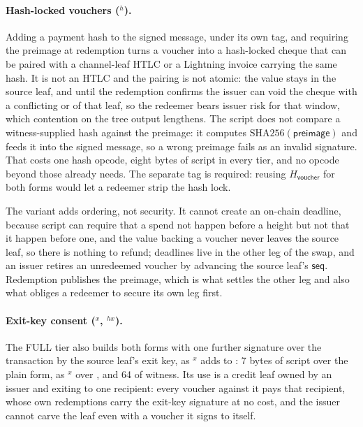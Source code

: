 \paragraph{Hash-locked vouchers ($^{h}$).} Adding a payment hash
to the signed message, under its own tag, and requiring the preimage at
redemption turns a voucher into a hash-locked cheque that can be paired
with a channel-leaf HTLC or a Lightning invoice carrying the same hash.
It is not an HTLC and the pairing is not atomic: the value stays in the
source leaf, and until the redemption confirms the issuer can void the
cheque with a conflicting  or  of that leaf, so the
redeemer bears issuer risk for that window, which contention on the tree
output lengthens. The
script does not compare a witness-supplied hash against the preimage: it
computes $\mathrm{SHA256}(\mathsf{preimage})$ and feeds it into the signed
message, so a wrong preimage fails as an invalid signature. That costs one
hash opcode, eight bytes of script in every tier, and
no opcode beyond those  already needs. The separate tag is
required: reusing $H_{\mathsf{voucher}}$ for both forms would let a
redeemer strip the hash lock.

The variant adds ordering, not security. It cannot create an on-chain
deadline, because script can require that a spend not happen before a
height but not that it happen before one, and the value backing a voucher
never leaves the source leaf, so there is nothing to refund; deadlines live
in the other leg of the swap, and an issuer retires an unredeemed voucher
by advancing the source leaf's $\mathsf{seq}$. Redemption publishes the
preimage, which is what settles the other leg and also what obliges a
redeemer to secure its own leg first.

\paragraph{Exit-key consent ($^{x}$, $^{hx}$).} The
FULL tier also builds both forms with one further signature over the
transaction by the source leaf's exit key, as $^{x}$ adds to
: 7 bytes of script over the plain form, as $^{x}$
over , and 64 of witness. Its use is a credit leaf
owned by an issuer and exiting to one recipient: every voucher against it
pays that recipient, whose own redemptions carry the exit-key signature
at no cost, and the issuer cannot carve the leaf even with a voucher it
signs to itself.

